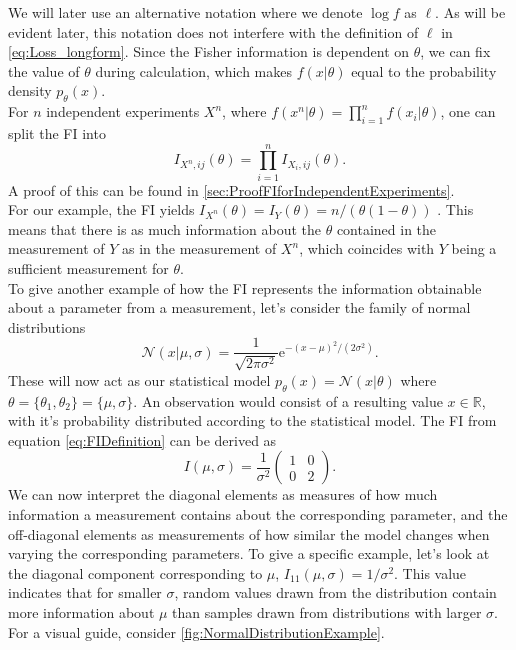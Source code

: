 We will later use an alternative notation where we denote $\log f$ as $\ell$. As will be evident later, this notation does not interfere with the definition of $\ell$ in \cref{eq:Loss_longform}. Since the Fisher information is dependent on $\theta$, we can fix the value of $\theta$ during calculation, which makes $f(x|\theta)$ equal to the probability density $p_\theta(x)$.\\ 
For $n$ independent experiments $X^n$, where $f(x^n|\theta) = \prod_{i=1}^n f(x_i|\theta)$, one can split the FI into 
\begin{equation}\label{eq:FIforIndependentExperiments}
	I_{X^n,ij}(\theta) = \prod_{i=1}^n I_{X_i,ij}(\theta).
\end{equation}
A proof of this can be found in \cref{sec:ProofFIforIndependentExperiments}.\\
For our example, the FI yields $I_{X^n}(\theta) = I_{Y}(\theta) = n/(\theta(1-\theta))$ \cite{StatisticFisherInfoTutorial}. This means that there is as much information about the $\theta$ contained in the measurement of $Y$ as in the measurement of $X^n$, which coincides with $Y$ being a sufficient measurement for $\theta$. \\
To give another example of how the FI represents the information obtainable about a parameter from a measurement, let's consider the family of normal distributions
\begin{equation}
	\mathcal{N}(x|\mu,\sigma) = \frac{1}{\sqrt{2\pi\sigma^2}}\mathrm{e}^{-(x-\mu)^2/(2\sigma^2)}.
\end{equation} 
These will now act as our statistical model $p_\theta(x) = \mathcal{N}(x|\theta)$ where $\theta = \{\theta_1,\theta_2\} = \{\mu, \sigma\}$. An observation would consist of a resulting value $x\in \mathbb{R}$, with it's probability distributed according to the statistical model. The FI from equation \cref{eq:FIDefinition} can be derived as 
\begin{equation}
	I(\mu,\sigma) = \frac{1}{\sigma^2}
	\begin{pmatrix}
		1 & 0 \\
		0 & 2
	\end{pmatrix}.
\end{equation}
We can now interpret the diagonal elements as measures of how much information a measurement contains about the corresponding parameter, and the off-diagonal elements as measurements of how similar the model changes when varying the corresponding parameters. To give a specific example, let's look at the diagonal component corresponding to $\mu$, $I_{11}(\mu,\sigma) = 1/\sigma^2$. This value indicates that for smaller $\sigma$, random values drawn from the distribution contain more information about $\mu$ than samples drawn from distributions with larger $\sigma$. For a visual guide, consider \cref{fig:NormalDistributionExample}.
